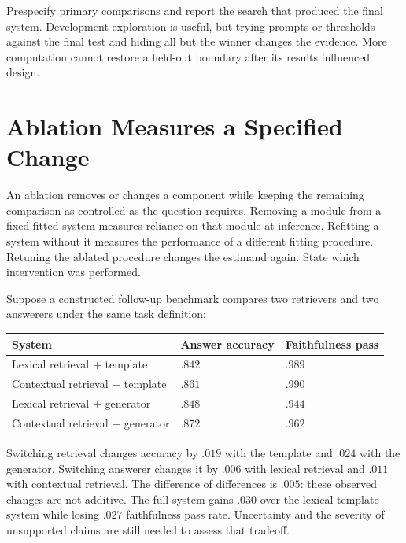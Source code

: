 Prespecify primary comparisons and report the search that produced the final system. Development exploration is useful, but trying prompts or thresholds against the final test and hiding all but the winner changes the evidence. More computation cannot restore a held-out boundary after its results influenced design.

\section{Ablation Measures a Specified Change}

An ablation removes or changes a component while keeping the remaining comparison as controlled as the question requires. Removing a module from a fixed fitted system measures reliance on that module at inference. Refitting a system without it measures the performance of a different fitting procedure. Retuning the ablated procedure changes the estimand again. State which intervention was performed.

Suppose a constructed follow-up benchmark compares two retrievers and two answerers under the same task definition:

\par\addvspace{\intextsep}\noindent\begin{minipage}{\linewidth}
\centering\small
\begin{tabular}{@{}L{5.0cm}L{2.5cm}L{2.2cm}@{}}
\toprule
System & Answer accuracy & Faithfulness pass \\
\midrule
Lexical retrieval + template & $.842$ & $.989$ \\
Contextual retrieval + template & $.861$ & $.990$ \\
Lexical retrieval + generator & $.848$ & $.944$ \\
Contextual retrieval + generator & $.872$ & $.962$ \\
\bottomrule
\end{tabular}
\label{tab:support-assistant-ablation}
\end{minipage}\par\addvspace{\intextsep}

Switching retrieval changes accuracy by $.019$ with the template and $.024$ with the generator. Switching answerer changes it by $.006$ with lexical retrieval and $.011$ with contextual retrieval. The difference of differences is $.005$: these observed changes are not additive. The full system gains $.030$ over the lexical-template system while losing $.027$ faithfulness pass rate. Uncertainty and the severity of unsupported claims are still needed to assess that tradeoff.


